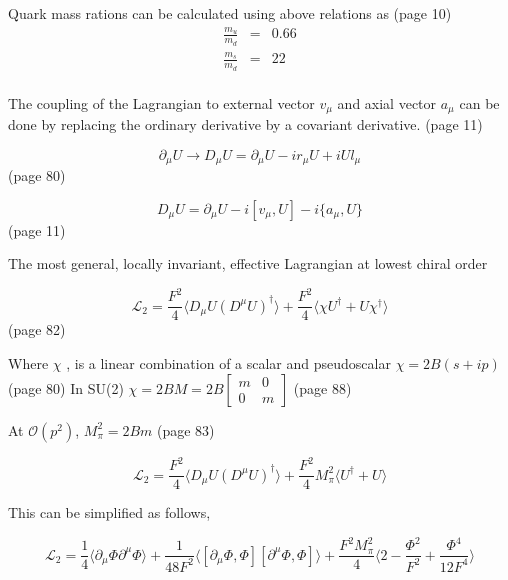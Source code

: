 \documentclass{article}
\begin{document}
Quark mass rations can be calculated using above relations as \cite{kubis2007introduction} (page 10)
\begin{eqnarray*}
	\frac{m_{u}}{m_{d}} & = &  0.66 \\
	\frac{m_{s}}{m_{d}} & = &  22 \\
\end{eqnarray*}








\newpage

The coupling of the Lagrangian to external vector $ v_{\mu} $ and axial vector $ a_{\mu} $ can be done by replacing the ordinary derivative by a
covariant derivative. \cite{kubis2007introduction} (page 11)

$$ \partial_{\mu} U  \rightarrow  D_{\mu} U = \partial_{\mu} U -ir_{\mu}U +iUl_{\mu} $$ \cite{scherer2003introduction} (page 80)

$$ D_{\mu} U = \partial_{\mu} U -i \left[v_{\mu},U\right]  -i \{a_{\mu},U \}$$ \cite{kubis2007introduction} (page 11)


\vspace{10mm}
The most general, locally invariant, effective Lagrangian at lowest chiral order

$$\mathcal L_{2}=\frac{F^{2}}{4} \Big \langle D_{\mu} U (D^{\mu} U)^{\dag} \Big \rangle 
+\frac{F^{2}}{4} \Big \langle   \chi U^{\dag}  +U \chi ^{\dag} \Big \rangle$$
\cite{scherer2003introduction} (page 82)

Where $ \chi $ , is a linear combination of a scalar and pseudoscalar $ \chi = 2B(s+ip)$ \cite{scherer2003introduction} (page 80)
In SU(2) $\chi = 2B M = 2B \left[ \begin{array}{cc}
	m & 0 \\
	0 & m\end{array} \right] $ \cite{scherer2003introduction} (page 88)

\vspace{5mm}	
At $\mathcal{O}(p^2)$, $ M_{\pi}^2= 2Bm $ \cite{scherer2003introduction} (page 83)	

$$\mathcal L_{2}=\frac{F^{2}}{4} \Big \langle D_{\mu} U (D^{\mu} U)^{\dag} \Big \rangle 
+\frac{F^{2}}{4} M_{\pi}^2 \Big \langle  U^{\dag}  +U  \Big \rangle$$

This can be simplified as follows, 

$$\mathcal L_{2}=\frac{1}{4} \Big \langle \partial_{\mu} \Phi \partial^{\mu} \Phi \Big \rangle 
+\frac{1}{48F^{2}} \Big \langle \left[ \partial_{\mu}\Phi, \Phi \right] \left[ \partial^{\mu}\Phi, \Phi \right] \Big \rangle + \frac{F^{2}M_{\pi}^2}{4} \Big \langle  2- \frac{\Phi^{2}}{F^{2}} + \frac{\Phi^{4}}{12F^{4}} \Big \rangle $$
\end{document}
